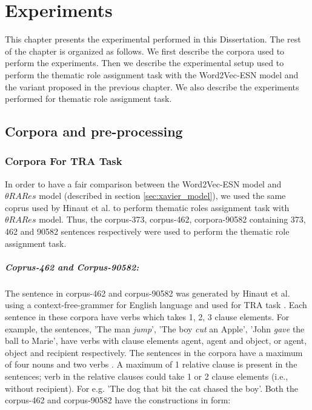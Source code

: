 \chapter{Experiments}\label{experiments}

This chapter presents the experimental performed in this Dissertation. The rest of the chapter is organized as follows. We first describe the corpora used to perform the experiments. Then we describe the experimental setup used to perform the thematic role assignment task with the Word2Vec-ESN model and the variant proposed in the previous chapter. We also describe the experiments performed for thematic role assignment task.

\section{Corpora and pre-processing}\label{datasets}

\subsection{Corpora For TRA Task}

In order to have a fair comparison between the Word2Vec-ESN model and $\theta RARes$ model (described in section \ref{sec:xavier_model}), we used the same coprus used by Hinaut et al. \cite{xavier:2013:RT, tra:xavier_hri} to perform thematic roles assignment task with $\theta RARes$ model. Thus, the corpus-373, corpus-462, corpora-90582 containing 373, 462 and 90582 sentences respectively were used to perform the thematic role assignment task.  

\paragraph{Coprus-462 and Corpus-90582: } The sentence in corpus-462 and corpus-90582 was generated by Hinaut et al. using a context-free-grammer for English language and used for TRA task \cite{xavier:2013:RT}. Each sentence in these corpora have verbs which takes 1, 2, 3 clause elements. For example, the sentences, 'The man \textit{jump}', 'The boy \textit{cut} an Apple', 'John \textit{gave} the ball to Marie', have verbs with clause elements agent, agent and object, or agent, object and recipient respectively. The sentences in the corpora have a maximum of four nouns and two verbs \cite{xavier:2013:RT}. A maximum of 1 relative clause is present in the sentences; verb in the relative clauses could take 1 or 2 clause elements (i.e., without recipient). For e.g. 'The dog that bit the cat chased the boy'. Both the corpus-462 and corpus-90582 have the constructions in form:

